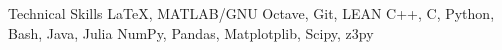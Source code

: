 \begin{rubric}{Technical Skills}
    \entry*[Software] \LaTeX, MATLAB/GNU Octave, Git, LEAN%
	\entry*[Programming] C++, C, Python, Bash, Java, Julia%
    \entry*[Libraries] NumPy, Pandas, Matplotplib, Scipy, z3py%
\end{rubric}